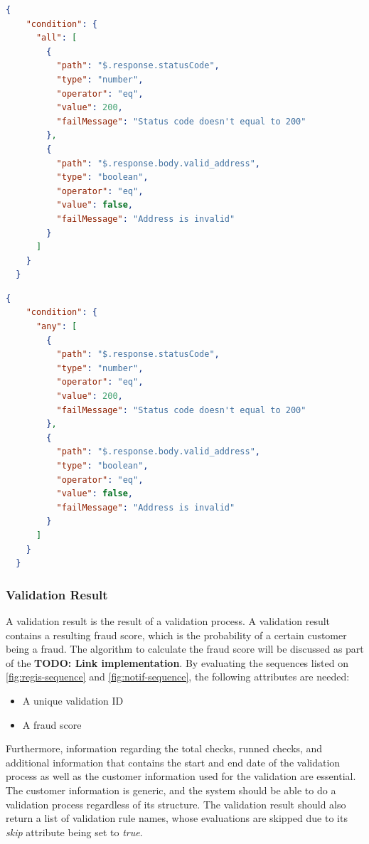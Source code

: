 \begin{lstlisting}[caption={Validation rule \textbf{condition} attribute example with ALL condition (JSON)}, language=json]
  {
    "condition": {
      "all": [
        {
          "path": "$.response.statusCode",
          "type": "number",
          "operator": "eq",
          "value": 200,
          "failMessage": "Status code doesn't equal to 200"
        },
        {
          "path": "$.response.body.valid_address",
          "type": "boolean",
          "operator": "eq",
          "value": false,
          "failMessage": "Address is invalid"
        }
      ]
    }
  }
\end{lstlisting}

\begin{lstlisting}[caption={Validation rule \textbf{condition} attribute example with ANY condition (JSON)}, language=json]
  {
    "condition": {
      "any": [
        {
          "path": "$.response.statusCode",
          "type": "number",
          "operator": "eq",
          "value": 200,
          "failMessage": "Status code doesn't equal to 200"
        },
        {
          "path": "$.response.body.valid_address",
          "type": "boolean",
          "operator": "eq",
          "value": false,
          "failMessage": "Address is invalid"
        }
      ]
    }
  }
\end{lstlisting}

\subsubsection{Validation Result}

A validation result is the result of a validation process. A validation result contains a resulting fraud score, which is the probability of a certain customer being a fraud. The algorithm to calculate the fraud score will be discussed as part of the \textbf{TODO: Link implementation}.
By evaluating the sequences listed on \autoref{fig:regis-sequence} and \autoref{fig:notif-sequence}, the following attributes are needed:

\begin{itemize}
  \item A unique validation ID
  \item A fraud score 
\end{itemize}

Furthermore, information regarding the total checks, runned checks, and additional information that contains the start and end date of the validation process as well as the customer information used for the validation are essential. The customer information is generic, and the system should be able to do a validation process regardless of its structure. The validation result should also return a list of validation rule names, whose evaluations are skipped due to its \emph{skip} attribute being set to \emph{true}.

